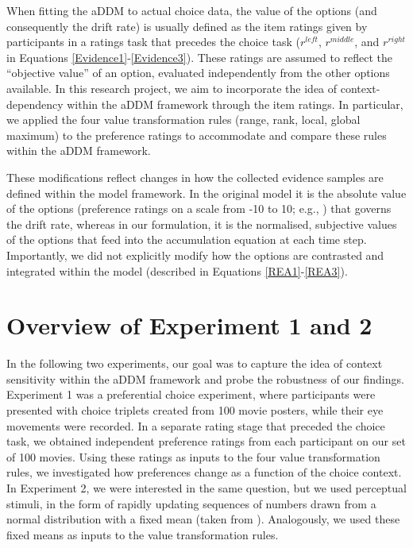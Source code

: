 \documentclass[11pt,a4paper]{article}
\begin{document}
When fitting the aDDM to actual choice data, the value of the options (and consequently the drift rate) is usually defined as the item ratings given by participants in a ratings task that precedes the choice task ($r^{left}$, $r^{middle}$, and $r^{right}$ in Equations \ref{Evidence1}-\ref{Evidence3}). These ratings are assumed to reflect the “objective value” of an option, evaluated independently from the other options available. In this research project, we aim to incorporate the idea of context-dependency within the aDDM framework through the item ratings. In particular, we applied the four value transformation rules (range, rank, local, global maximum) to the preference ratings to accommodate and compare these rules within the aDDM framework.


These modifications reflect changes in how the collected evidence samples are defined within the model framework. In the original model it is the absolute value of the options (preference ratings on a scale from -10 to 10; e.g., ) that governs the drift rate, whereas in our formulation, it is the normalised, subjective values of the options that feed into the accumulation equation at each time step. Importantly, we did not explicitly modify how the options are contrasted and integrated within the model (described in Equations \ref{REA1}-\ref{REA3}).



\section{Overview of Experiment 1 and 2}

In the following two experiments, our goal was to capture the idea of context sensitivity within the aDDM framework and probe the robustness of our findings. Experiment 1 was a preferential choice experiment, where participants were presented with choice triplets created from 100 movie posters, while their eye movements were recorded. In a separate rating stage that preceded the choice task, we obtained independent preference ratings from each participant on our set of 100 movies. Using these ratings as inputs to the four value transformation rules, we investigated how preferences change as a function of the choice context. In Experiment 2, we were interested in the same question, but we used perceptual stimuli, in the form of rapidly updating sequences of numbers drawn from a normal distribution with a fixed mean (taken from ). Analogously, we used these fixed means as inputs to the value transformation rules.
\end{document}
